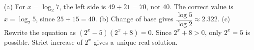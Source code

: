 (a) For $x=\log_2 7$, the left side is $49+21=70$, not $40$. The correct value is $\boxed{x=\log_2 5}$, since $25+15=40$. (b) Change of base gives $\dfrac{\log5}{\log2}\approx\boxed{2.322}$. (c) Rewrite the equation as $(2^x-5)(2^x+8)=0$. Since $2^x+8>0$, only $2^x=5$ is possible. Strict increase of $2^x$ gives a unique real solution.
